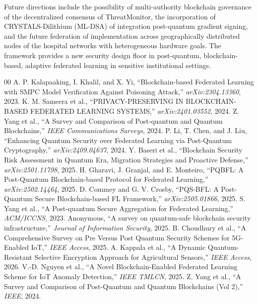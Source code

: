 \documentclass[journal, 10pt, twocolumn]{IEEEtran}
\begin{document}
Future directions include the possibility of multi-authority blockchain governance of the decentralized consensus of ThreatMonitor, the incorporation of CRYSTALS-Dilithium (ML-DSA) of integration post-quantum gradient signing, and the future federation of implementation across geographically distributed nodes of the hospital networks with heterogeneous hardware goals. The framework provides a new security design floor in post-quantum, blockchain-based, adaptive federated learning in sensitive institutional settings.

\begin{thebibliography}{00}
 A. P. Kalapaaking, I. Khalil, and X. Yi, ``Blockchain-based Federated Learning with SMPC Model Verification Against Poisoning Attack,'' \textit{arXiv:2304.13360}, 2023.
 K. M. Sameera et al., ``PRIVACY-PRESERVING IN BLOCKCHAIN-BASED FEDERATED LEARNING SYSTEMS,'' \textit{arXiv:2401.03552}, 2024.
 Z. Yang et al., ``A Survey and Comparison of Post-quantum and Quantum Blockchains,'' \textit{IEEE Communications Surveys}, 2024.
 P. Li, T. Chen, and J. Liu, ``Enhancing Quantum Security over Federated Learning via Post-Quantum Cryptography,'' \textit{arXiv:2409.04637}, 2024.
 Y. Baseri et al., ``Blockchain Security Risk Assessment in Quantum Era, Migration Strategies and Proactive Defense,'' \textit{arXiv:2501.11798}, 2025.
 H. Gharavi, J. Granjal, and E. Monteiro, ``PQBFL: A Post-Quantum Blockchain-based Protocol for Federated Learning,'' \textit{arXiv:2502.14464}, 2025.
 D. Commey and G. V. Crosby, ``PQS-BFL: A Post-Quantum Secure Blockchain-based FL Framework,'' \textit{arXiv:2505.01866}, 2025.
 S. Yang et al., ``A Post-quantum Secure Aggregation for Federated Learning,'' \textit{ACM/ICCNS}, 2023.
 Anonymous, ``A survey on quantum-safe blockchain security infrastructure,'' \textit{Journal of Information Security}, 2025.
 B. Choudhury et al., ``A Comprehensive Survey on Pre Versus Post Quantum Security Schemes for 5G-Enabled IoT,'' \textit{IEEE Access}, 2025.
 A. Kappala et al., ``A Dynamic Quantum-Resistant Selective Encryption Approach for Agricultural Sensors,'' \textit{IEEE Access}, 2026.
 V.-D. Nguyen et al., ``A Novel Blockchain-Enabled Federated Learning Scheme for IoT Anomaly Detection,'' \textit{IEEE TMLCN}, 2025.
 Z. Yang et al., ``A Survey and Comparison of Post-Quantum and Quantum Blockchains (Vol 2),'' \textit{IEEE}, 2024.

\end{thebibliography}
\end{document}
